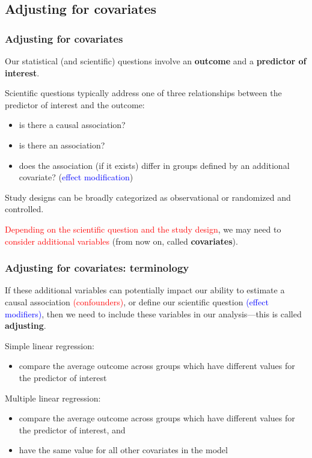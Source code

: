 \documentclass[12pt, 
hyperref={colorlinks=true, linkcolor=blue, urlcolor=cyan}]{beamer}
\begin{document}
\subsection{Adjusting for covariates}
\begin{frame}
\frametitle{Adjusting for covariates}

Our statistical (and scientific) questions involve an \textbf{outcome} and a \textbf{predictor of interest}.

Scientific questions typically address one of three relationships between the predictor of interest and the outcome: \vspace{-0.2cm}
\begin{itemize}
\item is there a causal association?
\item is there an association?
\item does the association (if it exists) differ in groups defined by an additional covariate? (\textcolor{blue}{effect modification})
\end{itemize}

Study designs can be broadly categorized as observational or randomized and controlled.

\textcolor{red}{Depending on the scientific question and the study design}, we may need to \textcolor{red}{consider additional variables} (from now on, called \textbf{covariates}).

\end{frame}

\begin{frame}
\frametitle{Adjusting for covariates: terminology}

If these additional variables can potentially impact our ability to estimate a causal association \textcolor{red}{(confounders)}, or define our scientific question \textcolor{blue}{(effect modifiers)}, then we need to include these variables in our analysis---this is called \textbf{adjusting}.

Simple linear regression: 
\begin{itemize}
\item compare the average outcome across groups which have different values for the predictor of interest
\end{itemize}

Multiple linear regression:
\begin{itemize}
\item compare the average outcome across groups which have different values for the predictor of interest, \pause and 
\item have the same value for all other covariates in the model
\end{itemize}
\end{frame}
\end{document}
